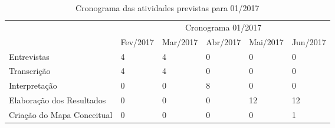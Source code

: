 \begin{table}[!htpb]
	\centering
	\begin{small} 
		\begin{tabular}{|p{5cm}|p{2cm}|p{2cm}|p{2cm}|p{2cm}|p{2cm}|}\hline
		 & \multicolumn{5}{c|}{Cronograma 01/2017}\\ \cline{2-6}
		\raisebox{1.5ex}{Entrevistas} & Fev/2017 & Mar/2017 & Abr/2017 & Mai/2017 & Jun/2017 \\ \hline
		Entrevistas   & 4 & 4 & 0 & 0 & 0 \\ \hline
		Transcrição   & 4 & 4 & 0 & 0 & 0 \\ \hline
		Interpretação & 0 & 0 & 8 & 0 & 0 \\ \hline
		Elaboração dos Resultados    & 0 & 0 & 0 & 12 & 12 \\ \hline
		Criação do Mapa Conceitual & 0 & 0 & 0 & 0 & 1 \\ \hline
		\end{tabular} 
	\end{small}
	\caption{Cronograma das atividades previstas para 01/2017}
	\label{t_cronograma}
\end{table} 